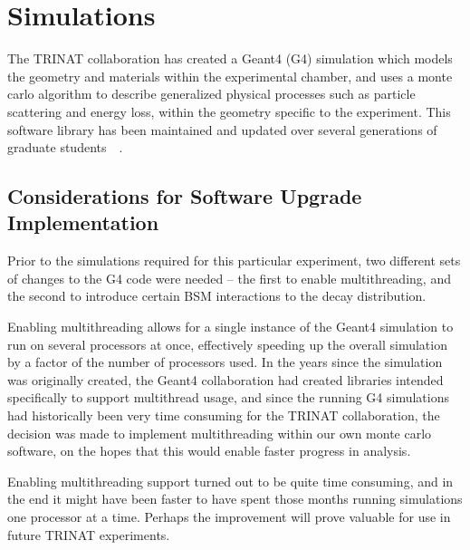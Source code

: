 % 
% 
% 
% 
\chapter{Simulations}
\label{simulations_chapter}

The TRINAT collaboration has created a Geant4 (G4) simulation which models the geometry and materials within the experimental chamber, and uses a monte carlo algorithm to describe generalized physical processes such as particle scattering and energy loss, within the geometry specific to the experiment.  This software library has been maintained and updated over several generations of graduate students~\cite{ben_thesis}~\cite{spencer_thesis}.  

\section{Considerations for Software Upgrade Implementation}
\label{sec:software_upgrades}
Prior to the simulations required for this particular experiment, two different sets of changes to the G4 code were needed -- the first to enable multithreading, and the second to introduce certain BSM interactions to the decay distribution.  

Enabling multithreading allows for a single instance of the Geant4 simulation to run on several processors at once, effectively speeding up the overall simulation by a factor of the number of processors used.  In the years since the simulation was originally created, the Geant4 collaboration had created libraries intended specifically to support multithread usage, and since the running G4 simulations had historically been very time consuming for the TRINAT collaboration, the decision was made to implement multithreading within our own monte carlo software, on the hopes that this would enable faster progress in analysis. 

Enabling multithreading support turned out to be quite time consuming, and in the end it might have been faster to have spent those months running simulations one processor at a time.  Perhaps the improvement will prove valuable for use in future TRINAT experiments.  

